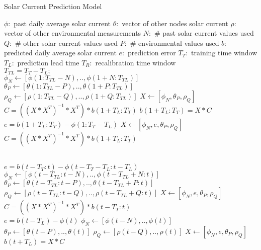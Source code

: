 \documentclass[prodmode,acmtosn]{acmsmall}
\begin{document}
\begin{algorithm}[!b]
\caption{Solar Current Prediction Model}\label{alg:pred}
\begin{algorithmic}[1]
\State $\phi:$ past daily average solar current
\State $\theta:$ vector of other nodes solar current 
\State $\rho:$ vector of other environmental measurements
\State $N:$ \# past solar current values used
\State $Q:$ \# other solar current values used
\State $P:$ \# environmental values used
\State $b:$ predicted daily average solar current
\State $e:$ prediction error
\State $T_{T}:$ training time window
\State $T_{L}:$ prediction lead time
\State $T_{R}:$ recalibration time window\\
\State $T_{TL} = T_{T}-T_{L};$\\

\State $\phi_N \gets [\phi(1:T_{TL}-N), .., \phi(1+N:T_{TL})]$ \label{alg:setupline1}
\State $\theta_P \gets [\theta(1:T_{TL}-P), .., \theta(1+P:T_{TL})]$
\State $\rho_Q \gets [\rho(1:T_{TL}-Q), .., \rho(1+Q:T_{TL})]$
\State $X \gets [\phi_N, \theta_P, \rho_Q]$ \label{alg:setupline2}
\State $C = ((X * X^T)^{-1} * X^T) * b(1+T_{L}:T_{T})$ \label{alg:calibration1}
\State $b(1+T_{L}:T_{T}) = X * C$ \label{alg:incerror1} \\ 

\State $e = b(1+T_{L}:T_{T}) - \phi(1:T_{T}-T_{L})$ 
\State $X \gets [\phi_N, e, \theta_P, \rho_Q]$ \label{alg:setupline3}
\State $C = ((X * X^T)^{-1} * X^T) * b(1+T_{L}:T_{T})$ \label{alg:calibration2} \\

 \label{alg:loop}

 \label{alg:recal} \\
\State $e = b(t-T_{T}:t) - \phi(t-T_{T}-T_{L}:t-T_{L})$
\State $\phi_N \gets [\phi(t-T_{TL}:t-N), .., \phi(t-T_{TL}+N:t)]$
\State $\theta_P \gets [\theta(t-T_{TL}:t-P), .., \theta(t-T_{TL}+P:t)]$
\State $\rho_Q \gets [\rho(t-T_{TL}:t-Q), .., \rho(t-T_{TL}+Q:t)]$
\State $X \gets [\phi_N, e, \theta_P, \rho_Q]$
\State $C = ((X * X^T)^{-1} * X^T) * b(t-T_{T}:t)$ \label{alg:calibration3}
\EndIf\\
\State $e = b(t-T_{L}) - \phi(t)$ \label{alg:error}
\State $\phi_N \gets [\phi(t-N), .., \phi(t)]$
\State $\theta_P \gets [\theta(t-P), .., \theta(t)]$
\State $\rho_Q \gets [\rho(t-Q), .., \rho(t)]$
\State $X \gets [\phi_N, e, \theta_P, \rho_Q]$
\State $b(t+T_{L}) = X * C$ \label{alg:prediction2}
\label{alg:pred:model}
\EndFor
\end{algorithmic}
\end{algorithm}
\end{document}
